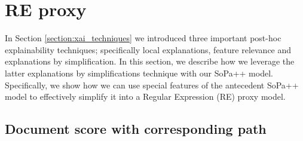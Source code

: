 \section{RE proxy}

In Section \ref{section:xai_techniques} we introduced three important post-hoc
explainability techniques; specifically local explanations, feature relevance
and explanations by simplification. In this section, we describe how we leverage
the latter explanations by simplifications technique with our SoPa++ model.
Specifically, we show how we can use special features of the antecedent SoPa++
model to effectively simplify it into a Regular Expression (RE) proxy model.

\subsection{Document score with corresponding path}

